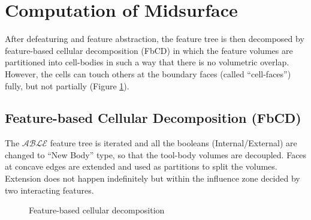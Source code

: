 \section{Computation of Midsurface}  \label{sec:litsurvey:fbcdmidsurf}
After defeaturing and feature abstraction, the feature tree is then decomposed by feature-based cellular decomposition (FbCD) in which the feature volumes are partitioned into cell-bodies in such a way that there is no volumetric overlap. However, the cells can touch others at the boundary faces (called ``cell-faces'') fully, but not partially (Figure \ref{fig_fbcd}). 

\subsection{Feature-based Cellular Decomposition (FbCD)} \label{cagd:sec:decomposition}
The $\mathcal{ABLE}$ feature tree is iterated and all the booleans (Internal/External) are changed to ``New Body'' type, so that the tool-body volumes are decoupled.
Faces at concave edges are extended and used as partitions to split the volumes. Extension does not happen indefinitely but within the influence zone decided by two interacting features.


\begin{figure}[!h]
\centering     %
{}
 \quad
{}
\caption{ Feature-based cellular decomposition}
\label{fig_fbcd}
\end{figure}

